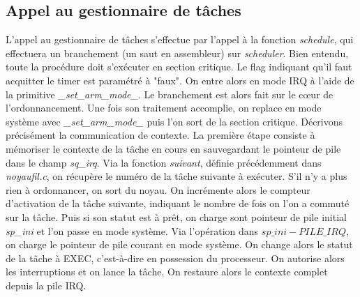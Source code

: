 \documentclass{article}
\begin{document}
\subsection{Appel au gestionnaire de tâches}
L'appel au gestionnaire de tâches s'effectue par l'appel à la fonction \textit{schedule}, qui effectuera un branchement (un saut en assembleur) sur \textit{scheduler}.
Bien entendu, toute la procédure doit s'exécuter en section critique. Le flag indiquant qu'il faut acquitter le timer est paramétré à "faux". On entre alors en mode IRQ à l'aide de la primitive \textit{\_set\_arm\_mode\_}. Le branchement est alors fait sur le cœur de l'ordonnancement. Une fois son traitement accomplie, on replace en mode système avec \textit{\_set\_arm\_mode\_} puis l'on sort de la section critique.
Décrivons précisément la communication de contexte. La première étape consiste à mémoriser le contexte de la tâche en cours en sauvegardant le pointeur de pile dans le champ \textit{sq\_irq}. Via la fonction \textit{suivant}, définie précédemment dans \textit{noyaufil.c}, on récupère le numéro de la tâche suivante à exécuter. S'il n'y a plus rien à ordonnancer, on sort du noyau. On incrémente alors le compteur d'activation de la tâche suivante, indiquant le nombre de fois on l'on a commuté sur la tâche. Puis si son statut est à prêt, on charge sont pointeur de pile initial \textit{sp\_ini} et l'on passe en mode système. Via l'opération dans $sp\_ini - PILE\_IRQ$, on charge le pointeur de pile courant en mode système. On change alors le statut de la tâche à EXEC, c'est-à-dire en possession du processeur. On autorise alors les interruptions et on lance la tâche. On restaure alors le contexte complet depuis la pile IRQ.
\end{document}
